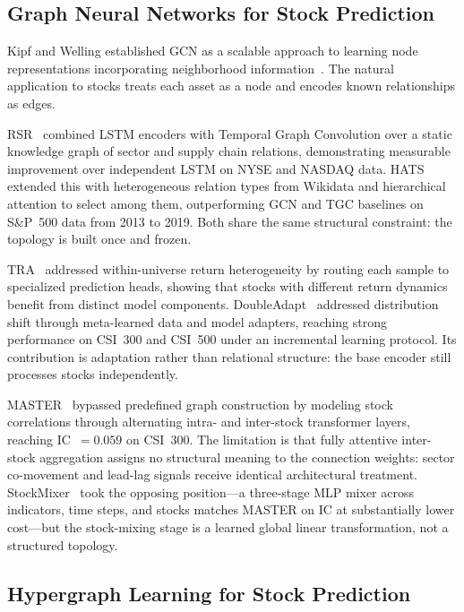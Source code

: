 \documentclass[journal]{IEEEtran}
\begin{document}
\subsection{Graph Neural Networks for Stock Prediction}

Kipf and Welling established GCN as a scalable approach to learning node
representations incorporating neighborhood
information~\cite{kipf2017semi}. The natural application to stocks
treats each asset as a node and encodes known relationships as edges.

RSR~\cite{feng2019temporal} combined LSTM encoders with Temporal Graph
Convolution over a static knowledge graph of sector and supply chain
relations, demonstrating measurable improvement over independent LSTM on
NYSE and NASDAQ data. HATS~\cite{kim2019hats} extended this with
heterogeneous relation types from Wikidata and hierarchical attention to
select among them, outperforming GCN and TGC baselines on S\&P~500 data
from 2013 to 2019. Both share the same structural constraint: the
topology is built once and frozen.

TRA~\cite{lin2021learning} addressed within-universe return
heterogeneity by routing each sample to specialized prediction heads,
showing that stocks with different return dynamics benefit from distinct
model components. DoubleAdapt~\cite{zhao2023doubleadapt} addressed
distribution shift through meta-learned data and model adapters,
reaching strong performance on CSI~300 and CSI~500 under an incremental
learning protocol. Its contribution is adaptation rather than relational
structure: the base encoder still processes stocks independently.

MASTER~\cite{li2024master} bypassed predefined graph construction by
modeling stock correlations through alternating intra- and inter-stock
transformer layers, reaching IC~$=0.059$ on CSI~300. The limitation is
that fully attentive inter-stock aggregation assigns no structural
meaning to the connection weights: sector co-movement and lead-lag
signals receive identical architectural treatment. StockMixer~\cite{fan2024stockmixer}
took the opposing position---a three-stage MLP mixer across indicators,
time steps, and stocks matches MASTER on IC at substantially lower
cost---but the stock-mixing stage is a learned global linear
transformation, not a structured topology.

\subsection{Hypergraph Learning for Stock Prediction}
\end{document}
